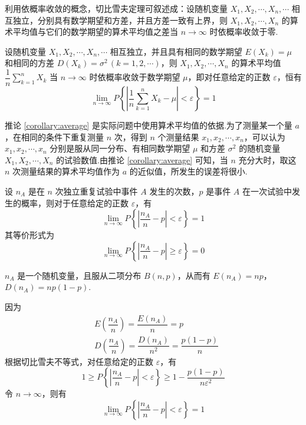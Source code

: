 利用依概率收敛的概念，切比雪夫定理可叙述成：设随机变量 $X_1, X_2, \cdots, X_n, \cdots$ 相互独立，分别具有数学期望和方差，并且方差一致有上界，则 $X_1, X_2, \cdots, X_n$ 的算术平均值与它们的数学期望的算术平均值之差当 $n \to \infty$ 时依概率收敛于零.

\begin{corollary} \label{corollary:average}
    设随机变量 $X_1, X_2, \cdots, X_n, \cdots$ 相互独立，并且具有相同的数学期望 $E(X_k) = \mu$ 和相同的方差 $D(X_k) = \sigma^2 \, (k=1,2,\cdots)$，则 $X_1, X_2, \cdots, X_n$ 的算术平均值 $\dfrac{1}{n} \displaystyle\sum_{k=1}^n X_k$ 当 $n \to \infty$ 时依概率收敛于数学期望 $\mu$，即对任意给定的正数 $\varepsilon$，恒有
    $$
    \lim_{n \to \infty} P \left\{ \left| \dfrac{1}{n} \sum_{k=1}^n X_k - \mu \right| < \varepsilon \right\} = 1
    $$
\end{corollary}

推论 \ref{corollary:average} 是实际问题中使用算术平均值的依据.为了测量某一个量 $a$，在相同的条件下重复测量 $n$ 次，得到 $n$ 个测量结果 $x_1,x_2,\cdots,x_n$，可以认为 $x_1,x_2,\cdots,x_n$ 分别是服从同一分布、有相同数学期望 $\mu$ 和方差 $\sigma^2$ 的随机变量 $X_1,X_2,\cdots,X_n$ 的试验数值.由推论 \ref{corollary:average} 可知，当 $n$ 充分大时，取这 $n$ 次测量结果的算术平均值作为 $a$ 的近似值，所发生的误差将很小.

\begin{theorem}[（伯努利定理）]
    设 $n_A$ 是在 $n$ 次独立重复试验中事件 $A$ 发生的次数，$p$ 是事件 $A$ 在一次试验中发生的概率，则对于任意给定的正数 $\varepsilon$，有
    $$
    \lim_{n \to \infty} P \left\{ \left| \dfrac{n_A}{n} - p \right| < \varepsilon \right\} = 1
    $$
    其等价形式为
    $$
    \lim_{n \to \infty} P \left\{ \left| \dfrac{n_A}{n} - p \right| \geqslant \varepsilon \right\} = 0
    $$
\end{theorem}

\begin{myproof}
    $n_A$ 是一个随机变量，且服从二项分布 $B(n,p)$，从而有 $E(n_A) = np$，$D(n_A) = np(1-p)$.

    因为
    $$
    \begin{aligned}
        & E(\dfrac{n_A}{n}) = \dfrac{E(n_A)}{n} = p \\
        & D(\dfrac{n_A}{n}) = \dfrac{D(n_A)}{n^2} = \dfrac{p(1-p)}{n}
    \end{aligned}
    $$
    根据切比雪夫不等式，对任意给定的正数 $\varepsilon$，有
    $$
    1 \geqslant P \left\{ \left| \dfrac{n_A}{n} - p \right| < \varepsilon \right\} \geqslant 1 - \dfrac{p(1-p)}{n \varepsilon^2}
    $$
    令 $n \to \infty$，则有
    $$
    \lim_{n \to \infty} P \left\{ \left| \dfrac{n_A}{n} - p \right| < \varepsilon \right\} = 1
    $$
\end{myproof}